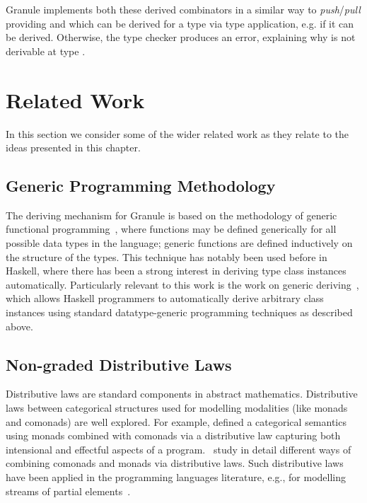 Granule implements both these derived combinators in a similar
way to \emph{push}/\emph{pull} providing 
and  which can be derived for a type  via type
application, e.g.  if it can be derived.
Otherwise, the type checker produces an error,
explaining why  is not derivable at type .

\section{Related Work}
\label{sec:der-related}
In this section we consider some of the wider related work as they relate to the
ideas presented in this chapter.
\subsection{Generic Programming Methodology}
The deriving mechanism for Granule is based on the methodology of generic
functional programming~\citep{hinze2000new}, where functions may be defined
generically for all possible data types in the language; generic functions are
defined inductively on the structure of the types. This technique has notably
been used before in Haskell, where there has been a strong interest in deriving
type class instances automatically. Particularly relevant to this work is the
work on generic deriving~\citep{generic-deriving}, which allows Haskell
programmers to automatically derive arbitrary class instances using standard
datatype-generic programming techniques as described above. 

\subsection{Non-graded Distributive Laws}
Distributive laws are standard components in abstract
mathematics. Distributive laws between categorical structures used for
modelling modalities (like monads and comonads) are well explored. For
example, \citet{brookes1993intensional} defined a categorical semantics using monads
combined with comonads via a distributive law capturing both
intensional and effectful aspects of a
program.~\citet{power2002combining} study in
detail different ways of combining comonads and monads via
distributive laws. Such distributive laws
have been applied in the programming languages literature, e.g., for
modelling streams of partial elements~\citep{uustalu2006essence}.

